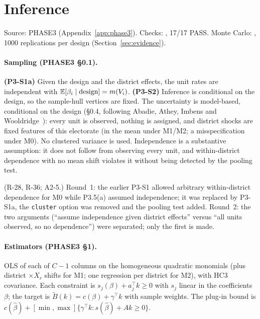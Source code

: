 \section{Inference}\label{sec:inference}

Source: PHASE3 (Appendix~\ref{app:phase3}). Checks: ,
17/17 PASS. Monte Carlo: , 1000 replications per
design (Section~\ref{sec:evidence}).

\paragraph{Sampling (PHASE3 \S0.1).} \textbf{(P3-S1a)} Given the design and the
district effects, the unit rates are independent with $\mathbb E[\beta_i\mid\text{design}]=m(V_i)$.
\textbf{(P3-S2)} Inference is conditional on the design, so the sample-hull
vertices are fixed. The uncertainty is model-based, conditional on the design
(\S0.4, following Abadie, Athey, Imbens and Wooldridge~\citep{aaiw2023}): every unit is observed, nothing is assigned, and district shocks are fixed
features of this electorate (in the mean under M1/M2; a misspecification under
M0). No clustered variance is used. Independence is a substantive assumption: it
does not follow from observing every unit, and within-district dependence with
no mean shift violates it without being detected by the pooling test.
\begin{revnote}
(R-28, R-36; A2-5.) Round~1: the earlier P3-S1 allowed arbitrary within-district
dependence for M0 while P3.5(a) assumed independence; it was replaced by P3-S1a,
the \texttt{cluster} option was removed and the pooling test added. Round~2: the
two arguments (``assume independence given district effects'' versus ``all units
observed, so no dependence'') were separated; only the first is made.
\end{revnote}

\paragraph{Estimators (PHASE3 \S1).} OLS of each of $C-1$ columns on the
homogeneous quadratic monomials (plus district $\times X_r$ shifts for M1; one
regression per district for M2), with HC3 covariance. Each constraint is
$s_j(\beta)+a_j^\top k\ge0$ with $s_j$ linear in the coefficients $\beta$; the
target is $\tilde B(k)=c(\beta)+\gamma^\top k$ with sample weights. The plug-in
bound is $c(\hat\beta)+[\min,\max]\{\gamma^\top k:s(\hat\beta)+Ak\ge0\}$.

